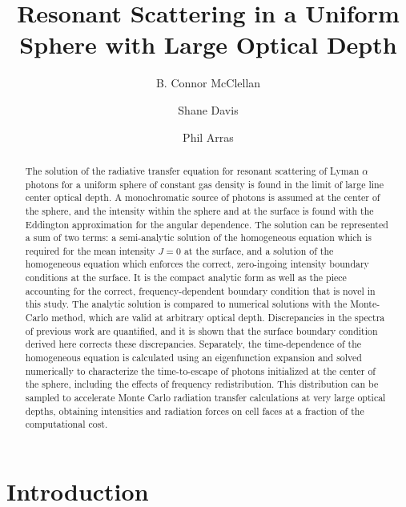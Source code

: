 \documentclass{aastex63}
\begin{document}
\title{Resonant Scattering in a Uniform Sphere with Large Optical Depth}




\author{B. Connor McClellan}
\author{Shane Davis}
\author{Phil Arras}


\begin{abstract}

The solution of the radiative transfer equation for resonant scattering of Lyman $\alpha$ photons for a uniform sphere of constant gas density is found in the limit of large line center optical depth. A monochromatic source of photons is assumed at the center of the sphere, and the intensity within the sphere and at the surface is found with the Eddington approximation for the angular dependence. The solution can be represented a sum of two terms: a semi-analytic solution of the homogeneous equation which is required for the mean intensity $J=0$ at the surface, and a solution of the homogeneous equation which enforces the correct, zero-ingoing intensity boundary conditions at the surface. It is the compact analytic form as well as the piece accounting for the correct, frequency-dependent boundary condition that is novel in this study. The analytic solution is compared to numerical solutions with the Monte-Carlo method, which are valid at arbitrary optical depth. Discrepancies in the spectra of previous work are quantified, and it is shown that the surface boundary condition derived here corrects these discrepancies. Separately, the time-dependence of the homogeneous equation is calculated using an eigenfunction expansion and solved numerically to characterize the time-to-escape of photons initialized at the center of the sphere, including the effects of frequency redistribution. This distribution can be sampled to accelerate Monte Carlo radiation transfer calculations at very large optical depths, obtaining intensities and radiation forces on cell faces at a fraction of the computational cost.

\end{abstract}


\keywords{}

\section{Introduction} 
\label{sec:intro}
\end{document}
